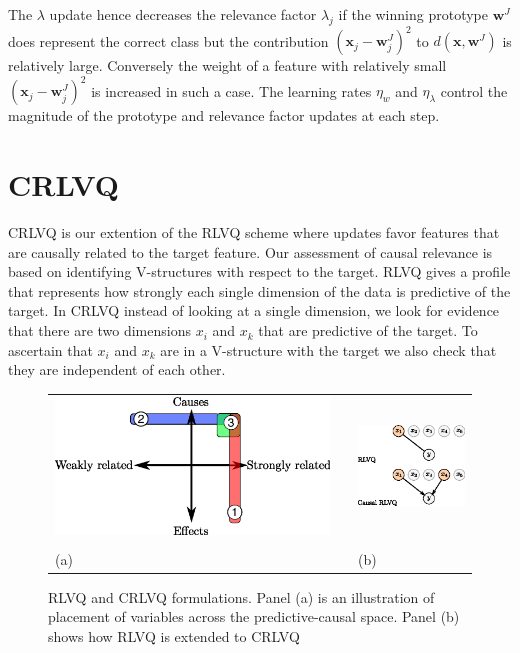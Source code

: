 \documentclass{esannV2}
\begin{document}
The $\lambda$ update hence decreases the relevance factor $\lambda_j$ if the winning prototype $\textbf{w}^J$ does represent the correct class but the contribution $(\textbf{x}_j - \textbf{w}^J_j)^2$ to $d(\textbf{x},\textbf{w}^J)$ is relatively large. Conversely the weight of a feature with relatively small $(\textbf{x}_j - \textbf{w}^J_j)^2$ is increased in such a case. The learning rates $\eta_w$ and $\eta_\lambda$ control the magnitude of the prototype and relevance factor updates at each step.

\section{CRLVQ}
\label{sec:CRLVQ}

CRLVQ is our extention of the RLVQ scheme where updates favor features that are causally related to the target feature. Our assessment of causal relevance is based on identifying V-structures with respect to the target. RLVQ gives a profile that represents how strongly each single dimension of the data is predictive of the target. In CRLVQ instead of looking at a single dimension, we look for evidence that there are two dimensions $x_i$ and $x_k$ that are predictive of the target. To ascertain that $x_i$ and $x_k$ are in a V-structure with the target we also check that they are independent of each other.

\begin{figure}[!h]
\begin{tabular}{m{}cm{}}
\includegraphics[width=.5\textwidth]{causal-relevance-dimensions.eps} & &
\includegraphics[width=.4\textwidth]{rlvq-crlvq.eps} \\
& \\
(a) & & (b)  
\end{tabular}
\label{fig:causes}
\caption{RLVQ and CRLVQ formulations. Panel (a) is an illustration of placement of variables across the predictive-causal space. Panel (b) shows how RLVQ is extended to CRLVQ}
\end{figure}
\end{document}
